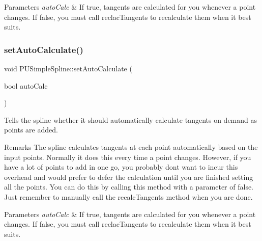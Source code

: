 \begin{DoxyParams}{Parameters}
{\em auto\+Calc} & If true, tangents are calculated for you whenever a point changes. If false, you must call reclac\+Tangents to recalculate them when it best suits. \\
\hline
\end{DoxyParams}
\mbox{\label{classPUSimpleSpline_aaac246974445d71eba4bd4ade9ee6d33}} 
\subsubsection{\texorpdfstring{set\+Auto\+Calculate()}{setAutoCalculate()}\hspace{0.1cm}{\footnotesize\ttfamily [2/2]}}
{\footnotesize\ttfamily void P\+U\+Simple\+Spline\+::set\+Auto\+Calculate (\begin{DoxyParamCaption}\item[{bool}]{auto\+Calc }\end{DoxyParamCaption})}

Tells the spline whether it should automatically calculate tangents on demand as points are added. \begin{DoxyRemark}{Remarks}
The spline calculates tangents at each point automatically based on the input points. Normally it does this every time a point changes. However, if you have a lot of points to add in one go, you probably don\textquotesingle{}t want to incur this overhead and would prefer to defer the calculation until you are finished setting all the points. You can do this by calling this method with a parameter of \textquotesingle{}false\textquotesingle{}. Just remember to manually call the recalc\+Tangents method when you are done. 
\end{DoxyRemark}

\begin{DoxyParams}{Parameters}
{\em auto\+Calc} & If true, tangents are calculated for you whenever a point changes. If false, you must call reclac\+Tangents to recalculate them when it best suits. \\
\hline
\end{DoxyParams}
\mbox{\label{classPUSimpleSpline_afb05b4a7e2bc40bd6dacc18c1d978fe2}} 

